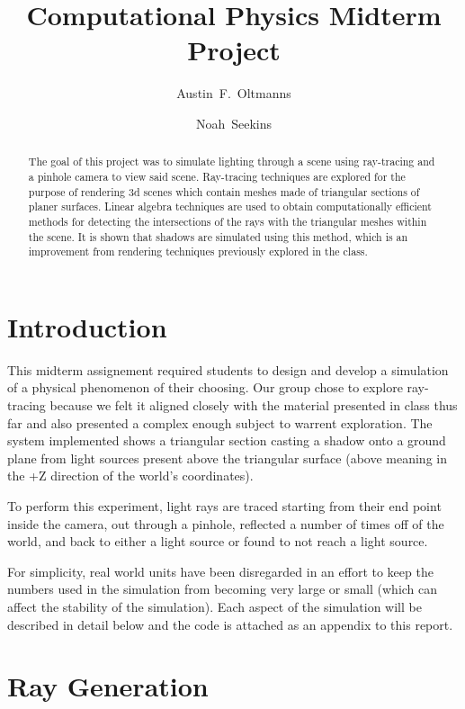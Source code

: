 \documentclass{article}
\begin{document}
\title{Computational Physics Midterm Project}
\author{
Austin~F.~Oltmanns
\and
Noah~Seekins
}

\maketitle

\begin{abstract}
The goal of this project was to simulate lighting through a scene using ray-tracing and a pinhole camera to view said scene.
Ray-tracing techniques are explored for the purpose of rendering 3d scenes which contain meshes made of
triangular sections of planer surfaces. Linear algebra techniques are used to obtain computationally 
efficient methods  for detecting the intersections of the rays with the triangular meshes within the scene.
It is shown that shadows are simulated using this method, which is an improvement 
from rendering techniques previously explored in the class.
\end{abstract} 

\section{Introduction}
This midterm assignement required students to design and develop a simulation of a physical phenomenon 
of their choosing. Our group chose to explore ray-tracing because we felt it aligned closely with the 
material presented in class thus far and also presented a complex enough subject to warrent exploration.
The system implemented shows a triangular section casting a shadow onto a ground plane from light sources
present above the triangular surface (above meaning in the +Z direction of the world's coordinates).

To perform this experiment, light rays are traced starting from their end point inside the camera, out through
a pinhole, reflected a number of times off of the world, and back to either a light source or found to not 
reach a light source.

For simplicity, real world units have been disregarded in an effort to keep the numbers used in the simulation from 
becoming very large or small (which can affect the stability of the simulation).
Each aspect of the simulation will be described in detail below and the code is attached as an appendix to this report.

\section{Ray Generation}
\end{document}
